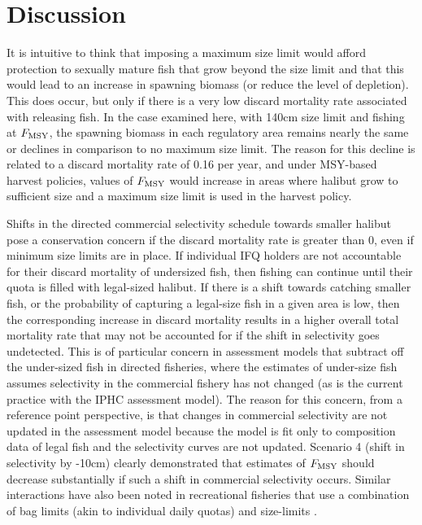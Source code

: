 

\section*{Discussion} %
\label{sec:discussion}

It is intuitive to think that imposing a maximum size limit would afford protection to sexually mature fish that grow beyond the size limit and that this would lead to an increase in spawning biomass (or reduce the level of depletion).  This does occur, but only if there is a very low discard mortality rate associated with releasing fish.  In the case examined here, with 140cm size limit and fishing at $F_{\rm{MSY}}$, the spawning biomass in each regulatory area remains nearly the same or  declines in comparison to no maximum size limit.  The reason for this decline is related to a discard mortality rate of 0.16 per year, and under MSY-based harvest policies, values of $F_{\rm{MSY}}$ would increase in areas where halibut grow to sufficient size and a maximum size limit is used in the harvest policy.

Shifts in the directed commercial selectivity schedule towards smaller halibut pose a conservation concern if the discard mortality rate is greater than 0, even if minimum size limits are in place. If individual IFQ holders are not accountable for their discard mortality of undersized fish, then fishing can continue until their quota is filled with legal-sized halibut.  If there is a shift towards catching smaller fish, or the probability of capturing a legal-size fish in a given area is low, then the corresponding increase in discard mortality  results in a higher overall total mortality rate that may not be accounted for if the shift in selectivity goes undetected.  This is of particular concern in assessment models that subtract off the under-sized fish in directed fisheries, where the estimates of under-size fish assumes selectivity in the commercial fishery has not changed (as is the current practice with the IPHC assessment model).  The reason for this concern, from a reference point perspective, is that changes in commercial selectivity are not updated in the assessment model because the model is fit only to composition data of legal fish and the selectivity curves are not updated.  Scenario 4 (shift in selectivity by -10cm) clearly demonstrated that estimates of $F_{\rm{MSY}}$ should decrease substantially if such a shift in commercial selectivity occurs.  Similar interactions have also been noted in recreational fisheries that use a combination of bag limits (akin to individual daily quotas) and size-limits \citep{goodyear1993spawning,coggins2007ecm}.

